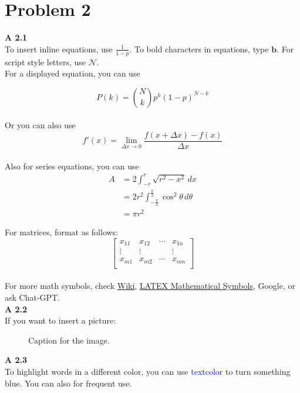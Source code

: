 \documentclass{article}
\newcommand{\important}[1]{{\color{blue}{\bf\sf #1}}}
\begin{document}
\section{Problem 2}
\noindent
\textbf{A 2.1}\\

\noindent
To insert inline equations, use $\frac{1}{1-p}$. To bold characters in equations, type $\mathbf{b}$. For script style letters, use $\mathcal{N}$.\\

\noindent
For a displayed equation, you can use

\begin{equation}
    P(k) = {N \choose k}p^{k}(1-p)^{N - k}
\end{equation}\\
Or you can also use 
$$
f'(x) = \lim_{\Delta x \to 0} \frac{f(x + \Delta x) - f(x)}{\Delta x}
$$\\
Also for series equations, you can use
\begin{align}
A &= 2 \int_{-r}^{r} \sqrt{r^2 - x^2} \, dx \\
  &= 2r^2 \int_{-\frac{\pi}{2}}^{\frac{\pi}{2}} \cos^2\theta \, d\theta \\
  &= \pi r^2 
\end{align}


\noindent
For matrices, format as follows:
\begin{equation}
    \begin{bmatrix}
    x_{11} & x_{12} & \cdots & x_{1n} \\
    \vdots & \vdots & & \vdots \\
    x_{m1} & x_{m2} & \cdots & x_{mn} \\
    \end{bmatrix}
\end{equation} \\

\noindent
For more math symbols, check \href{https://oeis.org/wiki/List_of_LaTeX_mathematical_symbols}{Wiki}, \href{https://www.cmor-faculty.rice.edu/~heinken/latex/symbols.pdf}{LATEX Mathematical Symbols}, Google, or ask Chat-GPT.\\

\noindent
\textbf{A 2.2}\\

If you want to insert a picture:

\begin{figure}[h]
\centering
\caption{Caption for the image.}
\label{fig:image1}
\end{figure}

\noindent
\textbf{A 2.3}\\

To highlight words in a different color, you can use \textcolor{blue}{textcolor} to turn something blue. You can also \important{define custom commands} for frequent use.
\end{document}
